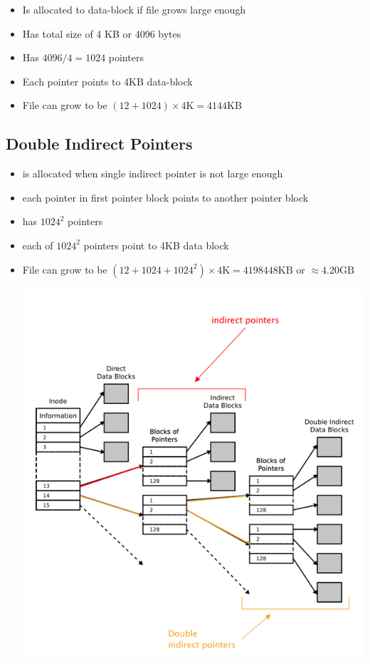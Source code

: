 \documentclass[12pt]{article}
\begin{document}
\begin{itemize}
    \item Is allocated to data-block if file grows large enough
    \item Has total size of 4 KB or 4096 bytes
    \item Has $4096/4 = 1024$ pointers
    \item Each pointer points to 4KB data-block
    \item File can grow to be $(12 + 1024) \times 4\text{K} = 4144\text{KB}$
\end{itemize}

\subsection{Double Indirect Pointers}

\begin{itemize}
    \item is allocated when single indirect pointer is not large enough
    \item each pointer in first pointer block points to another pointer block
    \item has $1024^2$ pointers
    \item each of $1024^2$ pointers point to 4KB data block
    \item File can grow to be $(12 + 1024 + 1024^2) \times 4\text{K} = 4198448\text{KB}$ or $\approx 4.20 \text{GB}$

    \begin{center}
    \includegraphics[width=\linewidth]{../images/midterm_2_solution_25.png}
    \end{center}
\end{itemize}
\end{document}
